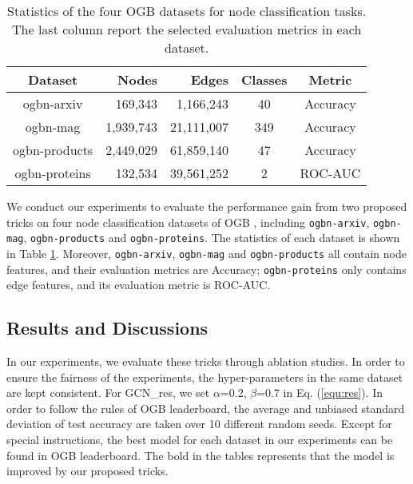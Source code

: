 \documentclass[runningheads]{llncs}
\begin{document}
\begin{table}[htbp] 
\caption{Statistics of the four OGB datasets for node classification tasks. The last column report the selected evaluation metrics in each dataset.}
\label{table:dataset-statistics}
\begin{center} 
\renewcommand\tabcolsep{7.0pt}

\begin{tabular}{c|r|r|c|c}
\hline
\textbf{Dataset}  & \textbf{Nodes}  & \textbf{Edges} & \textbf{Classes} & \textbf{Metric} \\
\hline
\hline
ogbn-arxiv             & 169,343     & 1,166,243   &   40     & Accuracy \\
ogbn-mag         & 1,939,743 & 21,111,007 & 349 & Accuracy \\
ogbn-products          & 2,449,029   & 61,859,140	    & 47 &Accuracy \\
ogbn-proteins          & 132,534	    & 39,561,252    &  2  & ROC-AUC \\
\hline
\end{tabular} 


\end{center}
\end{table}

We conduct our experiments to evaluate the performance gain from two proposed tricks on four node classification datasets of OGB \cite{hu2020open}, including
\texttt{ogbn-arxiv}, \texttt{ogbn-mag}, \texttt{ogbn-products} and
\texttt{ogbn-proteins}. The statistics of each dataset is
shown in Table \ref{table:dataset-statistics}. Moreover, \texttt{ogbn-arxiv}, \texttt{ogbn-mag} and \texttt{ogbn-products} all contain node features,
and their evaluation metrics are Accuracy;
\texttt{ogbn-proteins} only contains edge features, and its
evaluation metric is ROC-AUC.

\subsection{Results and
Discussions}

In our experiments, we evaluate these tricks through ablation studies. In order to ensure the
fairness of the experiments, the hyper-parameters in the same dataset
are kept consistent. For GCN\_res, we set $\alpha$=0.2, $\beta$=0.7 in Eq. (\ref{equ:res}). In order to follow the rules of OGB leaderboard, 
the average and unbiased standard deviation of test accuracy are
taken over 10 different random seeds. Except for special
instructions, the best model for each dataset in our experiments can be
found in OGB leaderboard. The bold in the tables represents that 
the model is improved by our proposed tricks.
\end{document}
